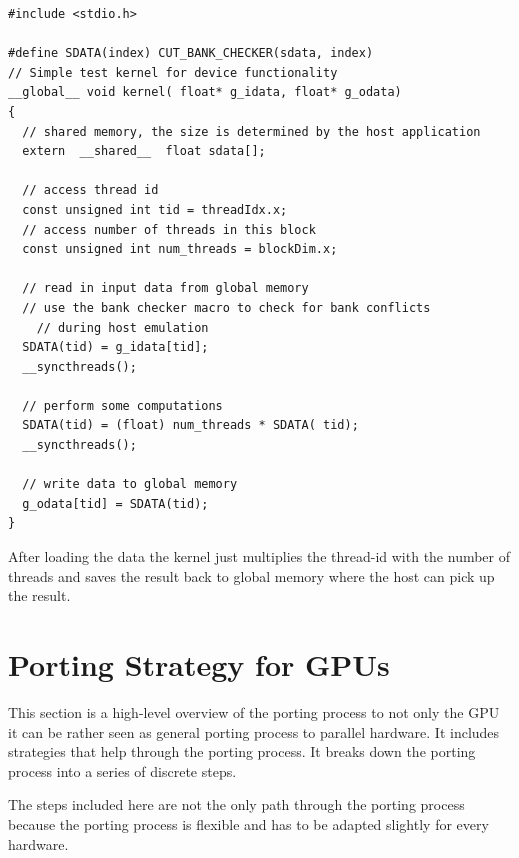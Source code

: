 \begin{lstlisting}[caption=CUDA device code, label=lst:device]
#include <stdio.h>

#define SDATA(index) CUT_BANK_CHECKER(sdata, index)
// Simple test kernel for device functionality
__global__ void kernel( float* g_idata, float* g_odata) 
{
  // shared memory, the size is determined by the host application
  extern  __shared__  float sdata[];

  // access thread id 
  const unsigned int tid = threadIdx.x;
  // access number of threads in this block 
  const unsigned int num_threads = blockDim.x;

  // read in input data from global memory
  // use the bank checker macro to check for bank conflicts
 	// during host emulation 
  SDATA(tid) = g_idata[tid];
  __syncthreads();

  // perform some computations 
  SDATA(tid) = (float) num_threads * SDATA( tid);
  __syncthreads();

  // write data to global memory 
  g_odata[tid] = SDATA(tid);
} 
\end{lstlisting} 


After loading the data the kernel just multiplies the thread-id with the number
of threads and saves the result back to global memory where the host can pick up
the result.

\section{Porting Strategy for GPUs}%
\label{sec:porting_strategies_for_gpu} 
This section  is a high-level overview of the porting process to not only
the \gls{GPU} it can be rather seen as general porting process to parallel 
hardware. It includes strategies that help through the porting process. It 
breaks down the porting process into a series of discrete steps. 

The steps included here are not the only path through the porting process because
the porting process is flexible and has to be adapted slightly for every hardware. 

